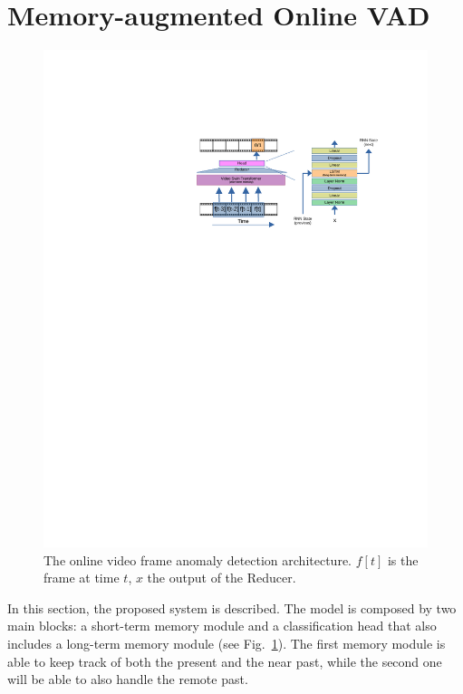 \section{Memory-augmented Online VAD}
\label{sec:theory}

\fboxsep=1mm%
\fboxrule=1pt%

\begin{figure}[!ht]
            \centerline{\includegraphics[trim=205 500 80 130, clip, width=0.8\linewidth]{images/arch.pdf}}
        \caption{The online video frame anomaly detection architecture. $f[t]$ is the frame at time $t$, $x$ the output of the Reducer.}
		\label{fig:arch}
\end{figure}

In this section, the proposed system is described.  
The model is composed by two main blocks: a short-term memory module and a classification head that also includes a long-term  memory module (see Fig.~\ref{fig:arch}). 
The first memory module is able to keep track of both the present and the near past, while the second one will be able to also handle the remote past.


